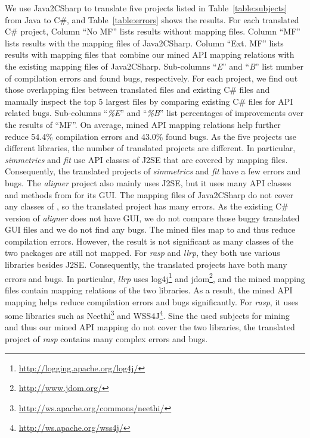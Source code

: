 We use Java2CSharp to translate five projects listed in
Table~\ref{table:subjects} from Java to C\#, and
Table~\ref{table:errors} shows the results. For each translated C\#
project, Column ``No MF'' lists results without mapping files.
Column ``MF'' lists results with the mapping files of Java2CSharp.
Column ``Ext. MF'' lists results with mapping files that combine
our mined API mapping relations with the existing mapping files of Java2CSharp.
Sub-columns ``\emph{E}'' and ``\emph{B}'' list number of
compilation errors and found bugs, respectively. For each project, we find out those overlapping files
between translated files and existing C\# files and manually inspect
the top 5 largest files by comparing existing C\# files for API
related bugs. Sub-columns ``\emph{\%E}'' and ``\emph{\%B}'' list
percentages of improvements over the results of ``MF''. On average,
mined API mapping relations help further reduce 54.4\% compilation errors
and 43.0\% found bugs. As the five projects use different libraries,
the number of translated projects are different. In particular,
\emph{simmetrics} and \emph{fit} use API classes of J2SE that are
covered by mapping files. Consequently, the translated projects of
\emph{simmetrics} and \emph{fit} have a few errors and bugs. The
\emph{aligner} project also mainly uses J2SE, but it uses many API
classes and methods from  for its GUI. The mapping
files of Java2CSharp do not cover any classes of ,
so the translated project has many errors. As the existing C\#
version of \emph{aligner} does not have GUI, we do not compare those
buggy translated GUI files and we do not find any bugs. The mined
files map  to  and
thus reduce compilation errors. However, the result is not
significant as many classes of the two packages are still not
mapped. For \emph{rasp} and \emph{llrp}, they both use various
libraries besides J2SE. Consequently, the translated projects have
both many errors and bugs. In particular, \emph{llrp} uses
log4j\footnote{\url{http://logging.apache.org/log4j/}} and
jdom\footnote{\url{http://www.jdom.org/}}, and the mined mapping
files contain mapping relations of the two libraries. As a result,
the mined API mapping helps reduce compilation errors and bugs
significantly. For \emph{rasp}, it uses some libraries such as
Neethi\footnote{\url{http://ws.apache.org/commons/neethi/}} and
WSS4J\footnote{\url{http://ws.apache.org/wss4j/}}. Sine the used
subjects for mining and thus our mined API mapping do not cover the
two libraries, the translated project of \emph{rasp} contains many
complex errors and bugs.

